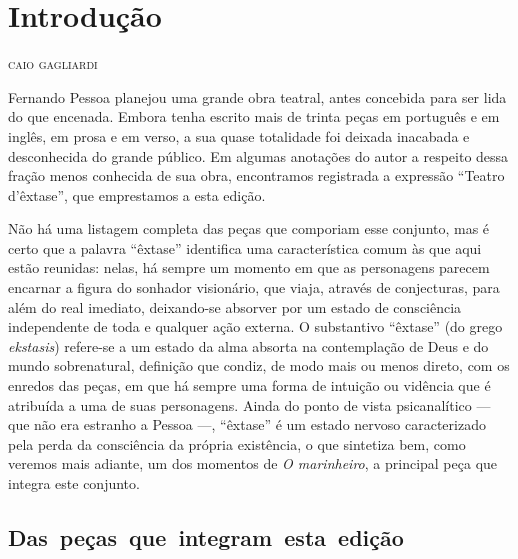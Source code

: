 \chapter[Introdução, \emph{por Caio Gagliardi}]{Introdução}

\begin{flushright}
\textsc{caio gagliardi}
\end{flushright}

\noindent{}Fernando Pessoa planejou uma grande obra teatral, antes concebida para
ser lida do que encenada. Embora tenha escrito mais de trinta peças em
português e em inglês, em prosa e em verso, a sua quase totalidade foi
deixada inacabada e desconhecida do grande público. Em algumas
anotações do autor a respeito dessa fração menos conhecida de sua obra,
encontramos registrada a expressão “Teatro d’êxtase”, que emprestamos a
esta edição. 

Não há uma listagem completa das peças que comporiam esse conjunto, mas é certo
que a palavra “êxtase” identifica uma característica comum às que aqui
estão reunidas: nelas, há sempre um momento em que as personagens
parecem encarnar a figura do sonhador visionário, que viaja, através de
conjecturas, para além do real imediato, deixando-se absorver por um
estado de consciência independente de toda e qualquer ação externa. O
substantivo “êxtase” (do grego \textit{ekstasis}) refere-se a um estado
da alma absorta na contemplação de Deus e do mundo sobrenatural,
definição que condiz, de modo mais ou menos direto, com os enredos das
peças, em que há sempre uma forma de intuição ou vidência que é
atribuída a uma de suas personagens. Ainda do ponto de vista
psicanalítico --- que não era estranho a Pessoa ---, “êxtase” é um estado
nervoso caracterizado pela perda da consciência da própria existência,
o que sintetiza bem, como veremos mais adiante, um dos momentos de
\textit{O marinheiro}, a principal peça que integra este conjunto.

\section{\mbox{Das peças que integram esta edição}}

